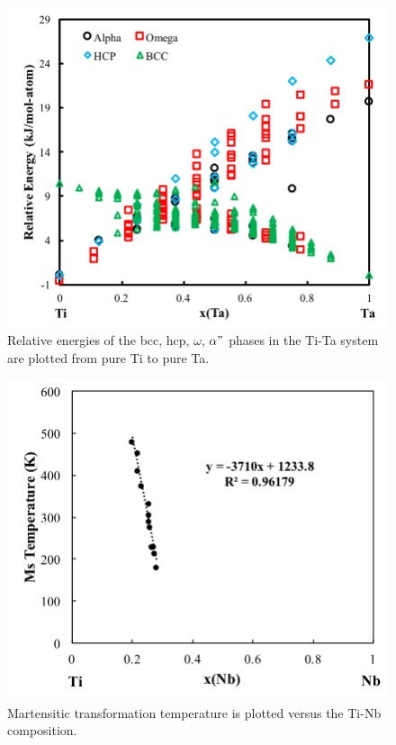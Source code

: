 \pagebreak
\begin{figure}[H]
	\centering
	\includegraphics[width=\textwidth]{Chapter-7/Figures/tita0k.png}
	\caption{Relative energies of the bcc, hcp, $\omega$, $\alpha"$ phases in the Ti-Ta system are plotted from pure Ti to pure Ta.}
	\label{Ch7-figure:titab0K}
\end{figure}

\pagebreak
\begin{figure}[H]
	\centering
	\includegraphics[width=\textwidth]{Chapter-7/Figures/tinbms.png}
	\caption{Martensitic transformation temperature is plotted versus the Ti-Nb composition.}
	\label{Ch7-figure:titnbms}
\end{figure}

